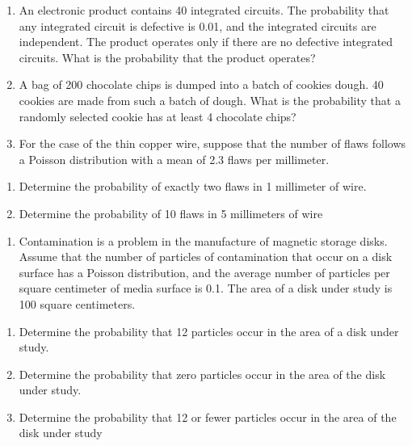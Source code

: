 \documentclass[]{book}
\providecommand{\tightlist}{%
  \setlength{\itemsep}{0pt}\setlength{\parskip}{0pt}}
\begin{document}
\begin{enumerate}
\def\labelenumi{\arabic{enumi}.}
\setcounter{enumi}{14}
\item
  An electronic product contains 40 integrated circuits. The probability that any integrated circuit is defective is 0.01, and the integrated circuits are independent. The product operates only if there are no defective integrated circuits. What is the probability that the product operates?
\item
  A bag of 200 chocolate chips is dumped into a batch of cookies dough. 40 cookies are made from such a batch of dough. What is the probability that a randomly selected cookie has at least 4 chocolate chips?
\item
  For the case of the thin copper wire, suppose that the number of flaws follows a Poisson distribution with a mean of 2.3 flaws per millimeter.
\end{enumerate}

\begin{enumerate}
\def\labelenumi{\alph{enumi})}
\item
  Determine the probability of exactly two flaws in 1 millimeter of wire.
\item
  Determine the probability of 10 flaws in 5 millimeters of wire
\end{enumerate}

\begin{enumerate}
\def\labelenumi{\arabic{enumi}.}
\setcounter{enumi}{17}
\tightlist
\item
  Contamination is a problem in the manufacture of magnetic storage disks. Assume that the number of particles of contamination that occur on a disk surface has a Poisson distribution, and the average number of particles per square centimeter of media surface is 0.1. The area of a disk under study is 100 square centimeters.
\end{enumerate}

\begin{enumerate}
\def\labelenumi{\alph{enumi})}
\item
  Determine the probability that 12 particles occur in the area of a disk under study.
\item
  Determine the probability that zero particles occur in the area of the disk under study.
\item
  Determine the probability that 12 or fewer particles occur in the area of the disk under study
\end{enumerate}
\end{document}
